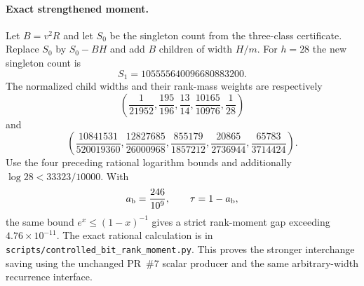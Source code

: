 \paragraph{Exact strengthened moment.}
Let $B=v^2R$ and let $S_0$ be the singleton count from the three-class
certificate. Replace $S_0$ by $S_0-BH$ and add $B$ children of width $H/m$.
For $h=28$ the new singleton count is
\[
 S_1=105555640096680883200.
\]
The normalized child widths and their rank-mass weights are respectively
\[
 \left(\frac1{21952},\frac{195}{196},\frac{13}{14},
             \frac{10165}{10976},\frac1{28}\right)
\]
and
\[
 \left(\frac{10841531}{520019360},\frac{12827685}{26000968},
       \frac{855179}{1857212},\frac{20865}{2736944},
       \frac{65783}{3714424}\right).
\]
Use the four preceding rational logarithm bounds and additionally
$\log 28<33323/10000$. With
\[
 a_{\rm b}=\frac{246}{10^9},\qquad\tau=1-a_{\rm b},
\]
the same bound $e^x\le(1-x)^{-1}$ gives a strict rank-moment gap exceeding
$4.76\times10^{-11}$. The exact rational calculation is in
\texttt{scripts/controlled\_bit\_rank\_moment.py}. This proves the stronger
interchange saving using the unchanged PR~\#7 scalar producer and the
same arbitrary-width recurrence interface.
